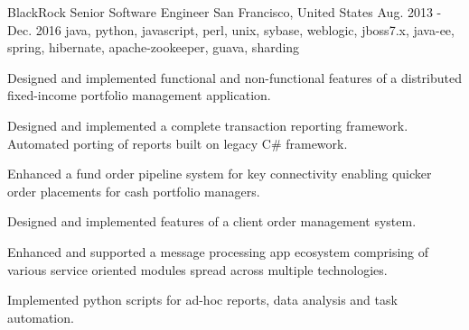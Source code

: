 \cventry
    {BlackRock} %
    {Senior Software Engineer} %
    {San Francisco, United States} %
    {Aug. 2013 - Dec. 2016} %
    {java, python, javascript, perl, unix, sybase, weblogic, jboss7.x, java-ee, spring, hibernate, apache-zookeeper, guava, sharding}%
    {
    \begin{cvitems} %
        \item { Designed and implemented functional and non-functional features of a distributed fixed-income portfolio management application.}
        \item { Designed and implemented a complete transaction reporting framework. Automated porting of reports built on legacy C\# framework.}
        \item { Enhanced a fund order pipeline system for key connectivity enabling quicker order placements for cash portfolio managers.}
        \item { Designed and implemented features of a client order management system. }
        \item { Enhanced and supported a message processing app ecosystem comprising of various service oriented modules spread across multiple technologies. }
        \item { Implemented python scripts for ad-hoc reports, data analysis and task automation.}
    \end{cvitems}
    }
